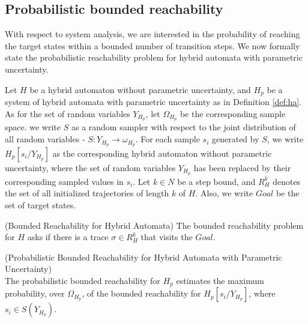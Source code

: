 \subsection{Probabilistic bounded reachability}
With respect to system analysis, we are interested in the probability of reaching the target states within a bounded number of transition steps. We now formally state the probabilistic reachability problem for hybrid automata with parametric uncertainty. 

Let $H$ be a hybrid automaton without parametric uncertainty, and $H_p$ be a system of hybrid automata with parametric uncertainty as in Definition \ref{def:ha}. As for the set of random variables $Y_{H_p}$, let $\Omega_{H_p}$ be the corresponding sample space. we write $S$ as a random sampler with respect to the joint distribution of all random variables - $S: Y_{H_p} \to \omega_{H_p}$. For each sample $s_i$ generated by $S$, we write $H_{p}[s_i/Y_{H_p}]$ as the corresponding hybrid automaton without parametric uncertainty, where the set of random variables $Y_{H_p}$ has been replaced by their corresponding sampled values in $s_i$. Let $k \in N$ be a step bound, and $R_{H}^k$ denotes the set of all initialized trajectories of length $k$ of $H$. Also, we write $Goal$ be the set of target states.
\begin{remark}
\label{def:br}
{\rm (Bounded Reachability for Hybrid Automata)}
The bounded reachability problem for $H$ asks if there is a trace $\sigma \in R_{H}^k$ that visits the $Goal$.
\end{remark}
\begin{definition}
\label{def:pbr}
{\rm (Probabilistic Bounded Reachability for Hybrid Automata with Parametric Uncertainty)}\\
The probabilistic bounded reachability for $H_p$ estimates the maximum probability, over $\Omega_{H_p}$, of the bounded reachability for $H_{p}[s_i/Y_{H_p}]$, where $s_i \in S(Y_{H_p})$.
\end{definition}

